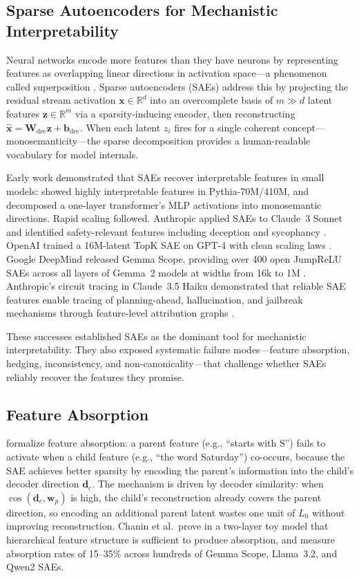 \documentclass{article}
\begin{document}
\subsection{Sparse Autoencoders for Mechanistic Interpretability}

Neural networks encode more features than they have neurons by representing features as overlapping linear directions in activation space---a phenomenon called superposition \citep{elhage2022superposition}. Sparse autoencoders (SAEs) address this by projecting the residual stream activation $\mathbf{x} \in \mathbb{R}^d$ into an overcomplete basis of $m \gg d$ latent features $\mathbf{z} \in \mathbb{R}^m$ via a sparsity-inducing encoder, then reconstructing $\hat{\mathbf{x}} = \mathbf{W}_{\text{dec}} \mathbf{z} + \mathbf{b}_{\text{dec}}$. When each latent $z_i$ fires for a single coherent concept---monosemanticity---the sparse decomposition provides a human-readable vocabulary for model internals.

Early work demonstrated that SAEs recover interpretable features in small models: \citet{cunningham2024sparse} showed highly interpretable features in Pythia-70M/410M, and \citet{bricken2023monosemanticity} decomposed a one-layer transformer's MLP activations into monosemantic directions. Rapid scaling followed. Anthropic applied SAEs to Claude~3 Sonnet and identified safety-relevant features including deception and sycophancy \citep{templeton2024scaling}. OpenAI trained a 16M-latent TopK SAE on GPT-4 with clean scaling laws \citep{gao2024scaling}. Google DeepMind released Gemma Scope, providing over 400 open JumpReLU SAEs across all layers of Gemma~2 models at widths from 16k to 1M \citep{lieberum2024gemma}. Anthropic's circuit tracing in Claude~3.5 Haiku demonstrated that reliable SAE features enable tracing of planning-ahead, hallucination, and jailbreak mechanisms through feature-level attribution graphs \citep{lindsey2025circuit}.

These successes established SAEs as the dominant tool for mechanistic interpretability. They also exposed systematic failure modes---feature absorption, hedging, inconsistency, and non-canonicality---that challenge whether SAEs reliably recover the features they promise.

\subsection{Feature Absorption}

\citet{chanin2024absorption} formalize feature absorption: a parent feature (e.g., ``starts with S'') fails to activate when a child feature (e.g., ``the word Saturday'') co-occurs, because the SAE achieves better sparsity by encoding the parent's information into the child's decoder direction $\mathbf{d}_c$. The mechanism is driven by decoder similarity: when $\cos(\mathbf{d}_c, \mathbf{w}_p)$ is high, the child's reconstruction already covers the parent direction, so encoding an additional parent latent wastes one unit of $L_0$ without improving reconstruction. Chanin et al.\ prove in a two-layer toy model that hierarchical feature structure is sufficient to produce absorption, and measure absorption rates of 15--35\% across hundreds of Gemma Scope, Llama~3.2, and Qwen2 SAEs.
\end{document}
